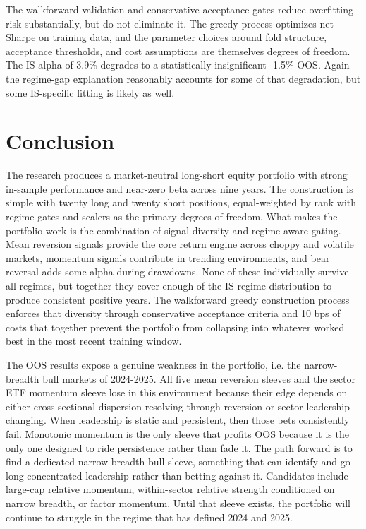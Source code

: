 \documentclass{article}
\begin{document}
The walkforward validation and conservative acceptance gates reduce overfitting risk substantially, but do not eliminate it. The greedy process optimizes net Sharpe on training data, and the parameter choices around fold structure, acceptance thresholds, and cost assumptions are themselves degrees of freedom. The IS alpha of 3.9\% degrades to a statistically insignificant -1.5\% OOS. Again the regime-gap explanation reasonably accounts for some of that degradation, but some IS-specific fitting is likely as well.

\section{Conclusion}

The research produces a market-neutral long-short equity portfolio with strong in-sample performance and near-zero beta across nine years. The construction is simple with twenty long and twenty short positions, equal-weighted by rank with regime gates and scalers as the primary degrees of freedom. What makes the portfolio work is the combination of signal diversity and regime-aware gating. Mean reversion signals provide the core return engine across choppy and volatile markets, momentum signals contribute in trending environments, and bear reversal adds some alpha during drawdowns. None of these individually survive all regimes, but together they cover enough of the IS regime distribution to produce consistent positive years. The walkforward greedy construction process enforces that diversity through conservative acceptance criteria and 10 bps of costs that together prevent the portfolio from collapsing into whatever worked best in the most recent training window.

The OOS results expose a genuine weakness in the portfolio, i.e. the narrow-breadth bull markets of 2024-2025. All five mean reversion sleeves and the sector ETF momentum sleeve lose in this environment because their edge depends on either cross-sectional dispersion resolving through reversion or sector leadership changing. When leadership is static and persistent, then those bets consistently fail. Monotonic momentum is the only sleeve that profits OOS because it is the only one designed to ride persistence rather than fade it. The path forward is to find a dedicated narrow-breadth bull sleeve, something that can identify and go long concentrated leadership rather than betting against it. Candidates include large-cap relative momentum, within-sector relative strength conditioned on narrow breadth, or factor momentum. Until that sleeve exists, the portfolio will continue to struggle in the regime that has defined 2024 and 2025.
\end{document}
